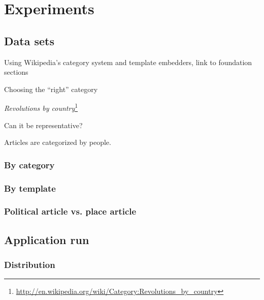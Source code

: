 \chapter{Experiments}\label{ch:experiment}

\section{Data sets}

\begin{todos}
	\item Using Wikipedia's category system and template embedders, link to foundation sections
    \item Choosing the ``right'' category 
    \item \emph{Revolutions by country}\footnote{\url{http://en.wikipedia.org/wiki/Category:Revolutions_by_country}}
    \item Can it be representative?
    \item Articles are categorized by people.
\end{todos}


\subsection{By category}

\subsection{By template}

\subsection{Political article vs. place article}



\section{Application run}


\subsection{Distribution}

